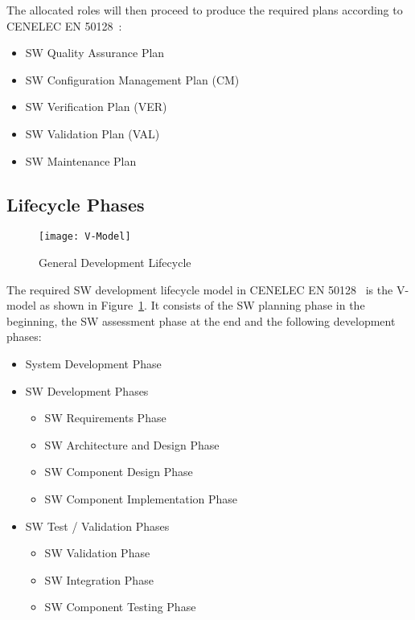 The allocated roles will then proceed to produce the required plans according to
CENELEC EN 50128~\cite{EN-50128}:

\begin{itemize}
\item SW Quality Assurance Plan
\item SW Configuration Management Plan (CM)
\item SW Verification Plan (VER)
\item SW Validation Plan (VAL)
\item SW Maintenance Plan
\end{itemize}


\subsection{Lifecycle Phases}
\label{sec:lifecycle-phases}

\begin{figure}[ht]
  \centering
  \texttt{[image: V-Model]}
  \caption{General Development Lifecycle~\cite{EN-50128}}
  \label{fig:develop-lifecycle-cenelec}
\end{figure}

The required SW development lifecycle model in CENELEC EN 50128~\cite{EN-50128}
is the V-model as shown in Figure~\ref{fig:develop-lifecycle-cenelec}. It
consists of the SW planning phase in the beginning, the SW assessment phase at
the end and the following development phases:

\begin{itemize}
\item System Development Phase
\item SW Development Phases
  \begin{itemize}
  \item SW Requirements Phase
  \item SW Architecture and Design Phase
  \item SW Component Design Phase
  \item SW Component Implementation Phase
  \end{itemize}
\item SW Test / Validation Phases
  \begin{itemize}
  \item SW Validation Phase
  \item SW Integration Phase
  \item SW Component Testing Phase
  \end{itemize}
\end{itemize}

